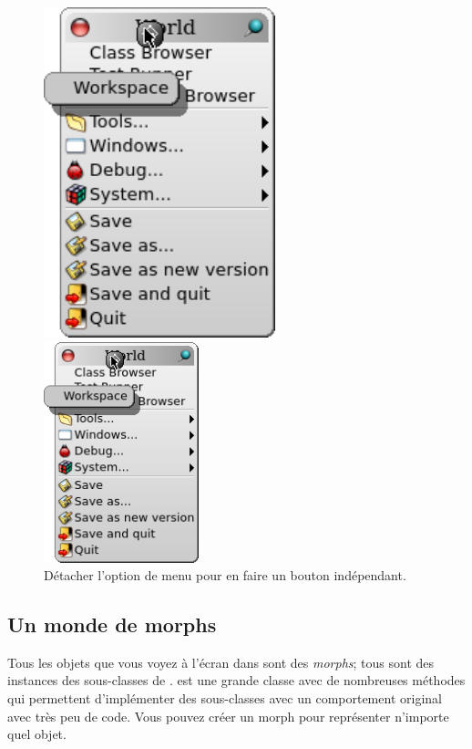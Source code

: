 \documentclass[a4paper,10pt,twoside]{book}
\begin{document}
\begin{figure}[ht]
	\ifluluelse
		{\centerline{\includegraphics[width=0.6\textwidth]{detachingMenu}}}
		{\centerline{\includegraphics[width=0.4\textwidth]{detachingMenu}}}
	\caption{Détacher l'option de menu  pour
      en faire un bouton indépendant.\label{fig:detachingMenu}}
\end{figure}

\subsection{Un monde de morphs}
Tous les objets que vous voyez à l'écran dans \pharo sont des
\emph{morphs}; tous sont des instances des sous-classes de .
\mbox{} est une grande classe avec de nombreuses méthodes
qui permettent d'implémenter des sous-classes avec un comportement
original avec très peu de code.
Vous pouvez créer un morph pour représenter n'importe quel objet. 
\end{document}
